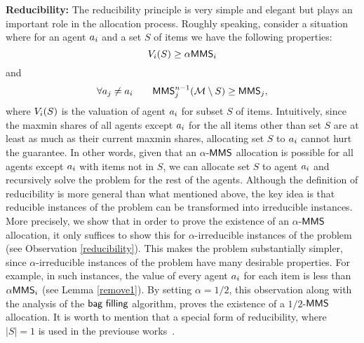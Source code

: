 \textbf{Reducibility:} The reducibility principle is very simple and elegant but plays an important role in the allocation process. Roughly speaking, consider a situation where for an agent $a_i$ and a set $S$ of items we have the following properties:
$$V_i(S) \geq \alpha \mathsf{MMS}_i$$
and $$ \forall a_j \neq a_i \qquad \mathsf{MMS}_j^{n-1}(\mathcal{M} \setminus S) \geq \mathsf{MMS}_j,$$ where $V_i(S)$ is the valuation of agent $a_i$ for subset $S$ of items. Intuitively, since the maxmin shares of all agents except $a_i$ for the all items other than set $S$ are at least as much as their current maxmin shares, allocating set $S$ to $a_i$ cannot hurt the guarantee. In other words, given that an $\alpha$-$\mathsf{MMS}$ allocation is possible for all agents except $a_i$ with items not in $S$, we can allocate set $S$ to agent $a_i$ and recursively solve the problem for the rest of the agents. Although the definition of reducibility is more general than what mentioned above, the key idea is that reducible instances of the problem can be transformed into irreducible instances. More precisely, we show that in order to prove the existence of an $\alpha$-$\mathsf{MMS}$ allocation, it only suffices to show this for $\alpha$-irreducible instances of the problem (see Observation \ref{reducibility}). This makes the problem substantially simpler, since $\alpha$-irreducible instances of the problem have many desirable properties. For example, in such instances, the value of every agent $a_i$ for each item is less than $\alpha \mathsf{MMS}_i$ (see Lemma \ref{remove1}). By setting $\alpha = 1/2$, this observation along with the analysis of the $\textsf{bag filling}$ algorithm, proves the existence of a $1/2$-$\mathsf{MMS}$ allocation. It is worth to mention that a special form of reducibility, where $|S|=1$ is used in the previouse works~\cite{amanatidis2015approximation,Procaccia:first}. %



